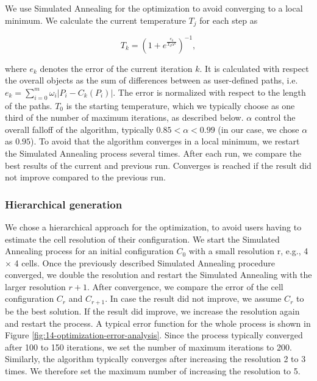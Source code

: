 We use Simulated Annealing for the optimization to avoid converging to a local minimum. We calculate the current temperature $T_j$ for each step as

$$T_k=(1+e^\frac{e_k}{T_0\alpha^k})^{-1},$$

where $e_k$ denotes the error of the current iteration $k$. It is calculated with respect the overall objects as the sum of differences between as user-defined paths, i.e. $e_k=\sum_{i=0}^{m}{\omega_i\left|P_i-C_k\left(P_i\right)\right|.}$ The error is normalized with respect to the length of the paths. $T_0$ is the starting temperature, which we typically choose as one third of the number of maximum iterations, as described below. $\alpha$ control the overall falloff of the algorithm, typically $0.85 < \alpha < 0.99$ (in our case, we chose $\alpha$ as $0.95$). To avoid that the algorithm converges in a local minimum, we restart the Simulated Annealing process several times. After each run, we compare the best results of the current and previous run. Converges is reached if the result did not improve compared to the previous run.


\subsubsection{Hierarchical generation}

We chose a hierarchical approach for the optimization, to avoid users having to estimate the cell resolution of their configuration. We start the Simulated Annealing process for an initial configuration $C_0$ with a small resolution r, e.g., 4 $\times$ 4 cells. Once the previously described Simulated Annealing procedure converged, we double the resolution and restart the Simulated Annealing with the larger resolution $r+1$. After convergence, we compare the error of the cell configuration $C_r$ and $C_{r+1}$. In case the result did not improve, we assume $C_r$ to be the best solution. If the result did improve, we increase the resolution again and restart the process. A typical error function for the whole process is shown in Figure \ref{fig:14-optimization-error-analysis}. Since the process typically converged after 100 to 150 iterations, we set the number of maximum iterations to 200. Similarly, the algorithm typically converges after increasing the resolution 2 to 3 times. We therefore set the maximum number of increasing the resolution to 5.

